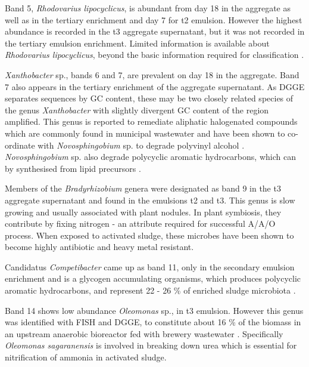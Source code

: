 \documentclass[11pt]{article}
\begin{document}
Band 5, \emph{Rhodovarius lipocyclicus}, is abundant from day 18 in the aggregate as well as in the tertiary enrichment and day 7 for t2 emulsion. However the highest abundance is recorded in the t3 aggregate supernatant, but it was not recorded in the tertiary emulsion enrichment. Limited information is available about \emph{Rhodovarius lipocyclicus}, beyond the basic information required for classification \cite{kampfer2004rhodovarius}.


\emph{Xanthobacter} sp., bands 6 and 7, are prevalent on day 18 in the aggregate. Band 7 also appears in the tertiary enrichment of the aggregate supernatant. As DGGE separates sequences by GC content, these may be two closely related species of the genus \emph{Xanthobacter} with slightly divergent GC content of the region amplified. This genus is reported to remediate aliphatic halogenated compounds which are commonly found in municipal wastewater \cite{janssen1985degradation} and have been shown to co-ordinate with \emph{Novosphingobium} sp. to degrade polyvinyl alcohol \cite{rong2009symbiotic}. \emph{Novosphingobium} sp. also degrade polycyclic aromatic hydrocarbons, which can by synthesised from lipid precursors \cite{addison2007novosphingobium}.


Members of the \emph{Bradyrhizobium} genera were designated as band 9 in the t3 aggregate supernatant and found in the emulsions t2 and t3. This genus is slow growing \cite{rebah2002wastewater} and usually associated with plant nodules. In plant symbiosis, they contribute by fixing nitrogen - an attribute required for successful A/A/O process. When exposed to activated sludge, these microbes have been shown to become highly antibiotic and heavy metal resistant.


Candidatus \emph{Competibacter} came up as band 11, only in the secondary emulsion enrichment and is a glycogen accumulating organisms, which produces polycyclic aromatic hydrocarbons, and represent 22 - 26 \% of enriched sludge microbiota \cite{bengtsson2008production,lemaire2008microbial}. 


Band 14 shows low abundance \emph{Oleomonas} sp., in t3 emulsion. However this genus was identified with FISH and DGGE, to constitute about 16 \% of the biomass in an upstream anaerobic bioreactor fed with brewery wastewater \cite{fernandez2008analysis}. Specifically \emph{Oleomonas sagaranensis} is involved in breaking down urea \cite{kanamori2005allophanate,kanamori2004enzymatic} which is essential for nitrification of ammonia in activated sludge.
\end{document}
